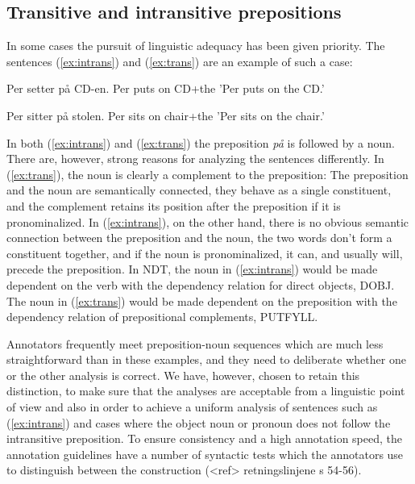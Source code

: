 \documentclass[11pt,a4paper]{article}
\begin{document}
\subsection{Transitive and intransitive prepositions}
In some cases the pursuit of linguistic adequacy has been given priority. The sentences (\ref{ex:intrans}) and (\ref{ex:trans}) are an example of such a case:

\begin{examples}
\item\label{ex:intrans}
\gll Per setter på CD-en.
Per puts on CD+the
\glt 'Per puts on the CD.'
\glend

\item\label{ex:trans}
\gll Per sitter på stolen.
Per sits on chair+the
\glt 'Per sits on the chair.'
\glend
\end{examples}

In both (\ref{ex:intrans}) and (\ref{ex:trans}) the preposition \emph{på} is followed by a noun. There are, however, strong reasons for analyzing the sentences differently. In (\ref{ex:trans}), the noun is clearly a complement to the preposition: The preposition and the noun are semantically connected, they behave as a single constituent, and the complement retains its position after the preposition if it is pronominalized. In (\ref{ex:intrans}), on the other hand, there is no obvious semantic connection between the preposition and the noun, the two words don't form a constituent together, and if the noun is pronominalized, it can, and usually will, precede the preposition. In NDT, the noun in (\ref{ex:intrans}) would be made dependent on the verb with the dependency relation for direct objects, DOBJ. The noun in (\ref{ex:trans}) would be made dependent on the preposition with the dependency relation of prepositional complements, PUTFYLL.

Annotators frequently meet preposition-noun sequences which are much less straightforward than in these examples, and they need to deliberate whether one or the other analysis is correct. We have, however, chosen to retain this distinction, to make sure that the analyses are acceptable from a linguistic point of view and also in order to achieve a uniform analysis of sentences such as (\ref{ex:intrans}) and cases where the object noun or pronoun does not follow the intransitive preposition. To ensure consistency and a high annotation speed, the annotation guidelines have a number of syntactic tests which the annotators use to distinguish between the construction (<ref> retningslinjene s 54-56).
\end{document}
